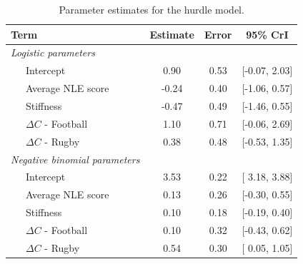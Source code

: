 \documentclass[man,floatsintext]{apa6}
\begin{document}
\begin{table}[H]

\begin{center}
\begin{threeparttable}

\caption{\label{tab:hurdlemodel}Parameter estimates for the hurdle model.}

\begin{tabular}{lccc}
\toprule
Term & Estimate & Error & 95\% CrI\\
\midrule
\textit{Logistic parameters} &  &  & \\
\ \ \ Intercept & 0.90 & 0.53 & [-0.07, 2.03]\\
\ \ \ Average NLE score & -0.24 & 0.40 & [-1.06, 0.57]\\
\ \ \ Stiffness & -0.47 & 0.49 & [-1.46, 0.55]\\
\ \ \ $\Delta C$ - Football & 1.10 & 0.71 & [-0.06, 2.69]\\
\ \ \ $\Delta C$ - Rugby & 0.38 & 0.48 & [-0.53, 1.35]\\
\textit{Negative binomial parameters} &  &  & \\
\ \ \ Intercept & 3.53 & 0.22 & [ 3.18, 3.88]\\
\ \ \ Average NLE score & 0.13 & 0.26 & [-0.30, 0.55]\\
\ \ \ Stiffness & 0.10 & 0.18 & [-0.19, 0.40]\\
\ \ \ $\Delta C$ - Football & 0.10 & 0.32 & [-0.43, 0.62]\\
\ \ \ $\Delta C$ - Rugby & 0.54 & 0.30 & [ 0.05, 1.05]\\
\bottomrule
\end{tabular}

\end{threeparttable}
\end{center}

\end{table}
\end{document}

